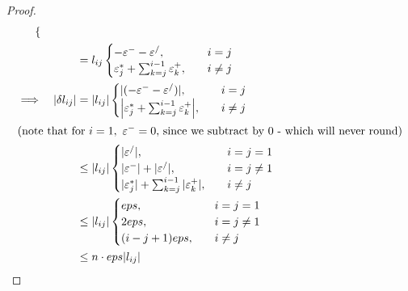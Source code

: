 \documentclass{article}
\theoremstyle{definition}
\begin{document}
\begin{enumerate}[leftmargin=\labelsep]
\begin{proof}
\begin{alignat*}{4}
\begin{cases}
			                                        \end{cases}          \\
			               &  &                 & = l_{ij} \begin{cases}
				                                               - \varepsilon^- - \varepsilon^/,                   & \quad i = j    \\
				                                               \varepsilon^*_j + \sum_{k=j}^{i-1}\varepsilon^+_k, & \quad i \neq j
			                                               \end{cases}                \\
			      \implies &  & |\delta l_{ij}| & = |l_{ij}| \begin{cases}
				                                                 |(- \varepsilon^- - \varepsilon^/)|,                      & \quad i = j    \\
				                                                 \vqty{\varepsilon^*_j + \sum_{k=j}^{i-1}\varepsilon^+_k}, & \quad i \neq j
			                                                 \end{cases} \\
			      \shortintertext{(note that for \(i = 1,\ \varepsilon^- = 0\), since we subtract by 0 - which will never round)}
			               &  &                 & \leq |l_{ij}| \begin{cases}
				                                                    |\varepsilon^/|,                                       & \quad i = j = 1    \\
				                                                    |\varepsilon^-| + |\varepsilon^/|,                     & \quad i = j \neq 1 \\
				                                                    |\varepsilon^*_j| + \sum_{k=j}^{i-1}|\varepsilon^+_k|, & \quad i \neq j
			                                                    \end{cases}   \\
			               &  &                 & \leq |l_{ij}| \begin{cases}
				                                                    eps,        & \quad i = j = 1    \\
				                                                    2eps,       & \quad i = j \neq 1 \\
				                                                    (i-j+1)eps, & \quad i \neq j
			                                                    \end{cases}                                              \\
			               &  &                 & \leq n \cdot eps |l_{ij}|
		      \end{alignat*}
	      \end{proof}


\end{enumerate}
\end{document}
